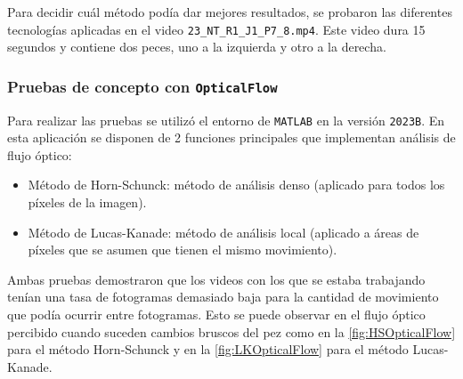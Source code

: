 \vspace{1\baselineskip}
Para decidir cuál método podía dar mejores resultados, se probaron las diferentes tecnologías aplicadas en el video \verb|23_NT_R1_J1_P7_8.mp4|. Este video dura 15 segundos y contiene dos peces, uno a 
la izquierda y otro a la derecha.

\clearpage
\subsubsection{Pruebas de concepto con \texttt{OpticalFlow}}

Para realizar las pruebas se utilizó el entorno de \texttt{MATLAB} en la versión \texttt{2023B}. En esta aplicación se disponen de 2 funciones principales 
que implementan análisis de flujo óptico: 
\begin{itemize}
    \item Método de Horn-Schunck: método de análisis denso (aplicado para todos los píxeles de la imagen).
    \item Método de Lucas-Kanade: método de análisis local (aplicado a áreas de píxeles que se asumen que tienen el mismo movimiento).
\end{itemize}

Ambas pruebas demostraron que los videos con los que se estaba trabajando tenían una tasa de fotogramas demasiado baja para la cantidad de movimiento que podía ocurrir entre fotogramas. 
Esto se puede observar en el flujo óptico percibido cuando suceden cambios bruscos del pez como en la \autoref{fig:HSOpticalFlow} para el método Horn-Schunck y en la \autoref{fig:LKOpticalFlow} 
para el método Lucas-Kanade.

